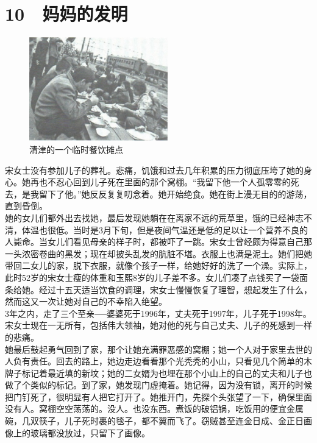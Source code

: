 \fancyhead[RO]{{\tiny{\textcolor{Gray}{\FA \ }}}\thepage}
\fancyhead[LE]{{\tiny{\textcolor{Gray}{\FA \ }}}\thepage}
\fancyfoot[LE,RO]{}
\fancyfoot[LO,CE]{}
\fancyfoot[CO,RE]{}
\chapter*{10 {\FA } 妈妈的发明}
\begin{figure}[!htbp]
	\centering
	\includegraphics[width=6cm]{./Chapters/Images/10.jpg}
	\caption*{清津的一个临时餐饮摊点}
\end{figure}


宋女士没有参加儿子的葬礼。悲痛，饥饿和过去几年积累的压力彻底压垮了她的身心。她再也不忍心回到儿子死在里面的那个窝棚。“我留下他一个人孤零零的死去，是我留下了他。”她反反复复叨念着。她开始绝食。她在街上漫无目的的游荡，直到昏倒。\\

她的女儿们都外出去找她，最后发现她躺在在离家不远的荒草里，饿的已经神志不清，体温也很低。当时是3月下旬，但是夜间气温还是低的足以让一个营养不良的人毙命。当女儿们看见母亲的样子时，都被吓了一跳。宋女士曾经颇为得意自己那一头浓密卷曲的黑发；现在却披头乱发的肮脏不堪。衣服上也满是泥土。她们把她带回二女儿的家，脱下衣服，就像个孩子一样，给她好好的洗了一个澡。实际上，此时52岁的宋女士瘦的体重和玉熙8岁的儿子差不多。女儿们凑了点钱买了一袋面条给她。经过十五天适当饮食的调理，宋女士慢慢恢复了理智，想起发生了什么，然而这又一次让她对自己的不幸陷入绝望。\\

3年之内，走了三个至亲──婆婆死于1996年，丈夫死于1997年，儿子死于1998年。宋女士现在一无所有，包括伟大领袖，她对他的死与自己丈夫、儿子的死感到一样的悲痛。\\

她最后鼓起勇气回到了家，那个让她充满罪恶感的窝棚；她一个人对于家里去世的人负有责任。回去的路上，她边走边看看那个光秃秃的小山，只看见几个简单的木牌子标记着最近填的新坟；她的二女婿为也埋在那个小山上的自己的丈夫和儿子也做了个类似的标记。到了家，她发现门虚掩着。她记得，因为没有锁，离开的时候把门钉死了，很明显有人把它打开了。她推开门，先探个头张望了一下，确保里面没有人。窝棚空空荡荡的。没人。也没东西。煮饭的破铝锅，吃饭用的便宜金属碗，几双筷子，儿子死时裹的毯子，都不翼而飞了。窃贼甚至连金日成、金正日画像上的玻璃都没放过，只留下了画像。\\

